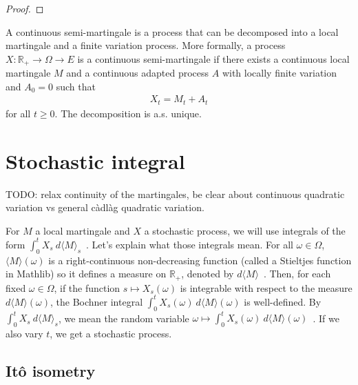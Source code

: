\begin{proof}

\end{proof}


\begin{definition}\label{def:continuousSemiMartingale}
A continuous semi-martingale is a process that can be decomposed into a local martingale and a finite variation process.
More formally, a process $X : \mathbb{R}_+ \to \Omega \to E$ is a continuous semi-martingale if there exists a continuous local martingale $M$ and a continuous adapted process $A$ with locally finite variation and $A_0 = 0$ such that
\begin{align*}
  X_t = M_t + A_t
\end{align*}
for all $t \ge 0$.
The decomposition is a.s. unique.
\end{definition}






\section{Stochastic integral}

TODO: relax continuity of the martingales, be clear about continuous quadratic variation vs general càdlàg quadratic variation.

For $M$ a local martingale and $X$ a stochastic process, we will use integrals of the form $\int_0^t X_s \: d\langle M \rangle_s$~.
Let's explain what those integrals mean. For all $\omega \in \Omega$, $\langle M \rangle(\omega)$ is a right-continuous non-decreasing function (called a Stieltjes function in Mathlib) so it defines a measure on $\mathbb{R}_+$, denoted by $d\langle M \rangle$~.
Then, for each fixed $\omega \in \Omega$, if the function $s \mapsto X_s(\omega)$ is integrable with respect to the measure $d\langle M \rangle(\omega)$, the Bochner integral $\int_0^t X_s(\omega) \: d\langle M \rangle(\omega)$ is well-defined.
By $\int_0^t X_s \: d\langle M \rangle_s$, we mean the random variable $\omega \mapsto \int_0^t X_s(\omega) \: d\langle M \rangle(\omega)$~.
If we also vary $t$, we get a stochastic process.



\subsection{Itô isometry}



